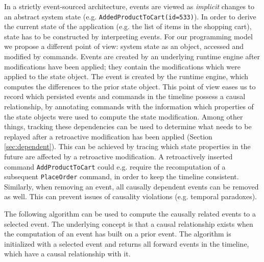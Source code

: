 In a strictly event-sourced architecture, events are viewed as \emph{implicit}
changes to an abstract system state (e.g. \texttt{AddedProductToCart(id=533)}). 
In order to derive the current state of the application (e.g. the list of items 
in the shopping cart), state has to be constructed by interpreting events.
%
For our programming model we propose a different point of view: 
system state as an object, accessed and modified by commands. Events are created 
by an underlying runtime engine after modifications have been applied; they 
contain the modifications which were applied to the state object. The event is 
created by the runtime engine, which computes the differences to the prior state 
object.
%
This point of view eases us to record which persisted events and commands in
the timeline possess a causal relationship, by annotating commands with the
information which properties of the state objects were used to compute the state 
modification. Among other things, tracking these dependencies can be used to 
determine what needs to be replayed after a retroactive modification has been 
applied (Section \ref{sec:dependent}). 
This can be achieved by tracing which state properties in the future are affected 
by a retroactive modification.
A retroactively inserted command \texttt{AddProductToCart} could e.g. require 
the recomputation of a subsequent \texttt{PlaceOrder} command, in order to keep 
the timeline consistent.
Similarly, when removing an event, all causally dependent events can be removed 
as well. This can prevent issues of causality violations (e.g. temporal paradoxes). 

The following algorithm can be used to compute the causally related events to a 
selected event. The underlying concept is that a causal relationship exists when 
the computation of an event has built on a prior event.
The algorithm is initialized with a selected event and returns all forward 
events in the timeline, which have a causal relationship with it.

